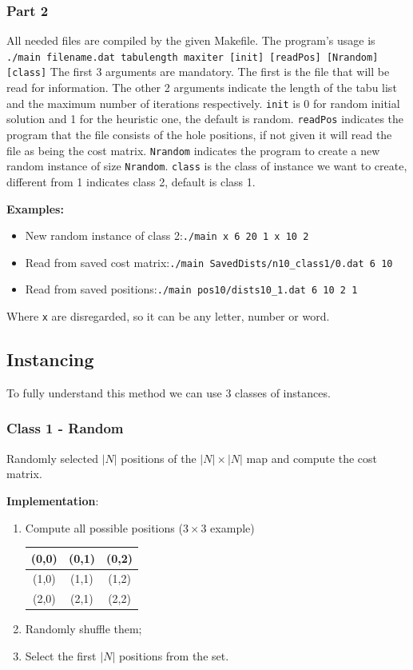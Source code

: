 \documentclass[a4paper,12pt]{article}
\begin{document}
			\subsubsection{Part 2}
				All needed files are compiled by the given Makefile.
				The program's usage is \texttt{./main filename.dat tabulength maxiter [init] [readPos] [Nrandom] [class]}
				The first 3 arguments are mandatory. 
				The first is the file that will be read for information.
				The other 2 arguments indicate the length of the tabu list and the maximum number of iterations respectively.
				\texttt{init} is 0 for random initial solution and 1 for the heuristic one, the default is random.
				\texttt{readPos} indicates the program that the file consists of the hole positions, if not given it will read the file as being the cost matrix.
				\texttt{Nrandom} indicates the program to create a new random instance of size \texttt{Nrandom}.
				\texttt{class} is the class of instance we want to create, different from 1 indicates class 2, default is class 1.
				
				\textbf{Examples:}
				\begin{itemize}
					\item New random instance of class 2:\texttt{./main x 6 20 1 x 10 2}
					\item Read from saved cost matrix:\texttt{./main SavedDists/n10\_class1/0.dat 6 10}
					\item Read from saved positions:\texttt{./main pos10/dists10\_1.dat 6 10 2 1}
				\end{itemize}
				Where \texttt{x} are disregarded, so it can be any letter, number or word.
					
		
		\subsection{Instancing}
			To fully understand this method we can use 3 classes of instances.
			
			\subsubsection{Class 1 - Random}
				Randomly selected $ |N| $ positions of the $ |N| \times |N| $ map and compute the cost matrix.
				
				\textbf{Implementation}:
				\begin{enumerate}
					\item Compute all possible positions ($ 3\times3 $ example)
					
					\begin{tabular}{|c|c|c|}
						\hline
						(0,0) & (0,1) & (0,2)  \\ \hline
						(1,0) & (1,1) & (1,2) \\ \hline
						(2,0) & (2,1) & (2,2) \\ \hline
					\end{tabular}
					\item Randomly shuffle them;
					\item Select the first $ |N| $ positions from the set.
				\end{enumerate}
				
\end{document}
